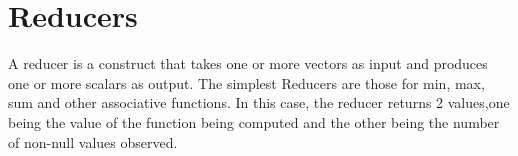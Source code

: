 \section{Reducers}
\label{reducers}

A reducer is a construct that takes one or more vectors as input and produces
one or more scalars as output. The simplest Reducers are those for min, max, sum
and other associative functions. In this case, the reducer returns 2 values,one
being the value of the function being computed and the other being the number of
non-null values observed. 

